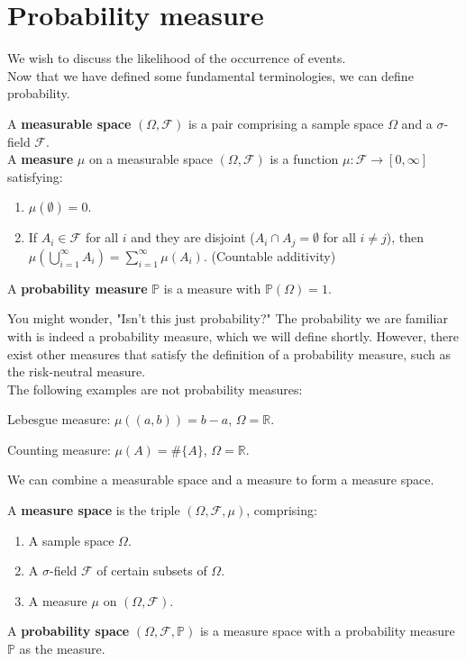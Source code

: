 \documentclass{huhtakm-template-book}
\newcommand{\prob}{\mathbb{P}}
\begin{document}
\section{Probability measure}
    We wish to discuss the likelihood of the occurrence of events.\\
    Now that we have defined some fundamental terminologies, we can define probability.
    \begin{defn} %
        A \textbf{measurable space} $(\Omega,\mathcal{F})$ is a pair comprising a sample space $\Omega$ and a $\sigma$-field $\mathcal{F}$.\\
        A \textbf{measure} $\mu$ on a measurable space $(\Omega,\mathcal{F})$ is a function $\mu:\mathcal{F}\to [0,\infty]$ satisfying:
        \begin{enumerate}
            \item $\mu(\emptyset)=0$.
            \item If $A_{i}\in\mathcal{F}$ for all $i$ and they are disjoint ($A_{i}\cap A_{j}=\emptyset$ for all $i\neq j$), then $\mu(\bigcup_{i=1}^{\infty}A_{i})=\sum_{i=1}^{\infty}\mu(A_{i})$. (Countable additivity)
        \end{enumerate}
        A \textbf{probability measure} $\prob$ is a measure with $\prob(\Omega)=1$.
    \end{defn}
    You might wonder, "Isn't this just probability?" The probability we are familiar with is indeed a probability measure, which we will define shortly. However, there exist other measures that satisfy the definition of a probability measure, such as the risk-neutral measure.\\
    The following examples are not probability measures:
    \begin{eg}
        Lebesgue measure: $\mu((a,b))=b-a$, $\Omega=\mathbb{R}$.
    \end{eg}
    \begin{eg}
        Counting measure: $\mu(A)=\#\{A\}$, $\Omega=\mathbb{R}$.
    \end{eg}
    We can combine a measurable space and a measure to form a measure space.
    \begin{defn} %
        A \textbf{measure space} is the triple $(\Omega,\mathcal{F},\mu)$, comprising:
        \begin{enumerate}
            \item A sample space $\Omega$.
            \item A $\sigma$-field $\mathcal{F}$ of certain subsets of $\Omega$.
            \item A measure $\mu$ on $(\Omega,\mathcal{F})$.
        \end{enumerate}
        A \textbf{probability space} $(\Omega,\mathcal{F},\prob)$ is a measure space with a probability measure $\prob$ as the measure.
    \end{defn}
\end{document}

